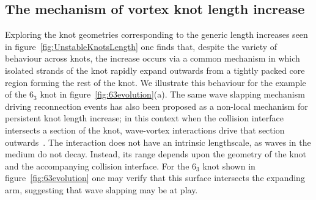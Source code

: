 \subsection{The mechanism of vortex knot length increase}
\label{subsec:Mechanism}
\begin{figure*}[hbtp]
    \caption[Dynamics of the $6_3$ knot.]{(overpage) Dynamics of the $6_3$ knot. (a) From $T=0$ to $T=2000$ the knot contracts and flattens, behaviour caused by the intrinsic curvature driven dynamics of an isolated filament mimicking a line tension. From $T=2000$ onwards length increases, with a single arm of the knot rapidly expanding outwards from an otherwise tightly packed core. (b) Comparison of the length evolution of the fully interacting $6_3$ vortex filament at $T=2000$ (green) to a copy encased in a `glass tube' of radius 10 (blue) or 15 (orange). With long-ranged interactions removed, the knot does not expand, but rather settles to a length of $\sim 400$ -- $600$. (c) Initial divergence in geometries between the interacting $6_3$ knot (green curve) and the radius $10$ tubed one (blue curve). Divergence does not occur globally, but is localised to two distinct expanding segments outside the lengthscale defined by the tube. (d) Distribution of filament twist during knot expansion. The expanding arm of the knot has twist values well below the $0.024$ rotations per space unit threshold for the sproing instability, and is less highly twisted than other, non-expanding, segments of the knot, ruling out this instability as the cause of length increase.}
\label{fig:63evolution} 
\end{figure*}
Exploring the knot geometries corresponding to the generic length increases seen in figure~\ref{fig:UnstableKnotsLength} one finds that, despite the variety of behaviour across knots, the increase occurs via a common mechanism in which isolated strands of the knot rapidly expand outwards from a tightly packed core region forming the rest of the knot. We illustrate this behaviour for the example of the $6_3$ knot in figure~\ref{fig:63evolution}(a). The same wave slapping mechanism driving reconnection events has also been proposed as a non-local mechanism for persistent knot length increase; in this context when the collision interface intersects a section of the knot, wave-vortex interactions drive that section outwards~\citep{WinfreeChapter,Sutcliffe2003}. The interaction does not have an intrinsic lengthscale, as waves in the medium do not decay. Instead, its range depends upon the geometry of the knot and the accompanying collision interface. For the $6_3$ knot shown in figure~\ref{fig:63evolution} one may verify that this surface intersects the expanding arm, suggesting that wave slapping may be at play. 

